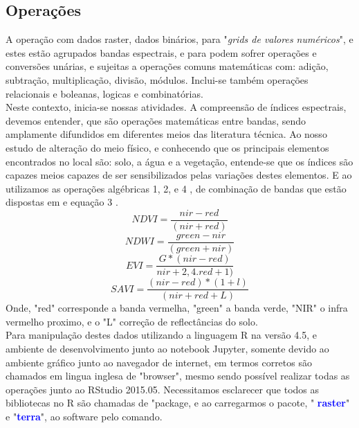   \subsection*{Operações}  
 \hspace*{1.25 cm} A operação com dados raster, dados binários, para \cite[106]{Dormam} "\textit{grids de valores numéricos}", e estes estão agrupados bandas espectrais, e para \cite[p.178 e p.181]{Liu}  podem sofrer operações e conversões unárias, e sujeitas a operações comuns matemáticas com: adição, subtração, multiplicação, divisão, módulos. Inclui-se também operações relacionais e boleanas, logicas e combinatórias.  \\
 \hspace*{1.25 cm}  Neste contexto, inicia-se nossas atividades. A compreensão de índices espectrais, devemos entender, que são operações matemáticas entre bandas, sendo amplamente difundidos em diferentes meios das literatura técnica. Ao nosso estudo de alteração do meio físico, e conhecendo que os principais elementos encontrados no local são: solo, a água e a vegetação, entende-se  que  os índices  são capazes meios capazes de ser sensibilizados pelas variações destes elementos. E ao utilizamos as operações algébricas  1, 2, e 4 , de combinação de bandas que estão dispostas em \cite[p.165]{Thekapbail} e equação 3 \cite[p.7]{Thekapbail}. 
 \begin{equation}
 	 NDVI = \dfrac{nir - red}{ (nir + red) }
 \end{equation}
 \begin{equation}
	NDWI = \dfrac{green - nir}{ (green + nir) }
\end{equation}
 \begin{equation}
	EVI = \dfrac{G*(nir - red)}{ nir + 2,4. red +1) }
\end{equation}
 \begin{equation}
	SAVI = \dfrac{(nir - red)*(1 +l)}{ (nir + red +L) }
\end{equation}
%
\hspace*{1.25 cm} Onde, "red" corresponde a banda vermelha, "green" a banda verde, "NIR" o infra vermelho proximo, e o "L" correção de reflectâncias do solo.\\
%
 \hspace*{1.25 cm} Para manipulação destes dados utilizando a linguagem R na versão 4.5, e ambiente de desenvolvimento junto ao notebook Jupyter, somente devido ao ambiente gráfico junto ao navegador de internet, em termos corretos são chamados em lingua inglesa de "browser", mesmo sendo possível realizar todas as operações junto ao RStudio 2015.05. Necessitamos esclarecer que  todos as bibliotecas no R são chamadas de "package, e ao carregarmos o pacote, " \textbf{\textcolor{blue}{raster}}" e "\textbf{\textcolor{blue}{terra}}", ao software pelo comando.
